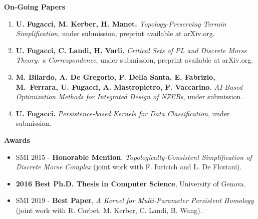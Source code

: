 \documentclass[11pt]{article}
\begin{document}
\noindent
{\bf On-Going Papers}
\begin{enumerate}

\item {\bf U. Fugacci, M. Kerber, H. Manet.} {\em Topology-Preserving Terrain Simplification}, under submission, preprint available at arXiv.org.

\item {\bf U. Fugacci, C. Landi, H. Varli.} {\em Critical Sets of PL and Discrete Morse Theory: a Correspondence}, under submission, preprint available at arXiv.org.

\item {\bf M. Bilardo, A. De Gregorio, F. Della Santa, E. Fabrizio,
M. Ferrara, U. Fugacci, A. Mastropietro, F. Vaccarino.} {\em AI-Based Optimization Methods for Integrated Design of NZEBs}, under submission. %

\item {\bf U. Fugacci.} {\em Persistence-based Kernels for Data Classification}, under submission.


%
%
%
%

\end{enumerate}


\vspace*{2.5ex}
\noindent
{\Large\bf Awards}
\begin{itemize}
\item SMI 2015 - {\bf Honorable Mention}, {\em Topologically-Consistent Simplification of Discrete Morse Complex} (joint work with F. Iuricich and L. De Floriani).
\item {\bf 2016 Best Ph.D. Thesis in Computer Science}, University of Genova.
\item SMI 2019 - {\bf Best Paper}, {\em A Kernel for Multi-Parameter Persistent Homology} (joint work with R. Corbet, M. Kerber, C. Landi, B. Wang).
\end{itemize}
\end{document}
